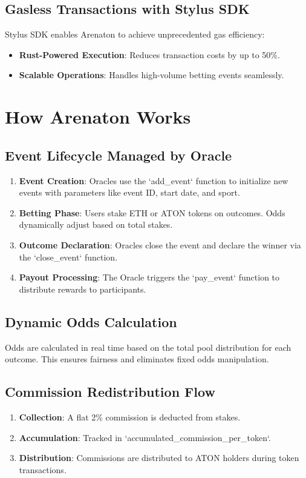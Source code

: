 \documentclass[9pt]{article}
\begin{document}
\begin{multicols}{2}
		\subsection{Gasless Transactions with Stylus SDK}
		Stylus SDK enables Arenaton to achieve unprecedented gas efficiency:
		\begin{itemize}
			\item \textbf{Rust-Powered Execution}: Reduces transaction costs by up to 50\%.
			\item \textbf{Scalable Operations}: Handles high-volume betting events seamlessly.
		\end{itemize}
		
		\section{How Arenaton Works}
		\subsection{Event Lifecycle Managed by Oracle}
		\begin{enumerate}
			\item \textbf{Event Creation}: Oracles use the `add\_event` function to initialize new events with parameters like event ID, start date, and sport.
			\item \textbf{Betting Phase}: Users stake ETH or ATON tokens on outcomes. Odds dynamically adjust based on total stakes.
			\item \textbf{Outcome Declaration}: Oracles close the event and declare the winner via the `close\_event` function.
			\item \textbf{Payout Processing}: The Oracle triggers the `pay\_event` function to distribute rewards to participants.
		\end{enumerate}
		
		\subsection{Dynamic Odds Calculation}
		Odds are calculated in real time based on the total pool distribution for each outcome. This ensures fairness and eliminates fixed odds manipulation.
		
		\subsection{Commission Redistribution Flow}
		\begin{enumerate}
			\item \textbf{Collection}: A flat 2\% commission is deducted from stakes.
			\item \textbf{Accumulation}: Tracked in `accumulated\_commission\_per\_token`.
			\item \textbf{Distribution}: Commissions are distributed to ATON holders during token transactions.
		\end{enumerate}
		

\end{multicols}
\end{document}
